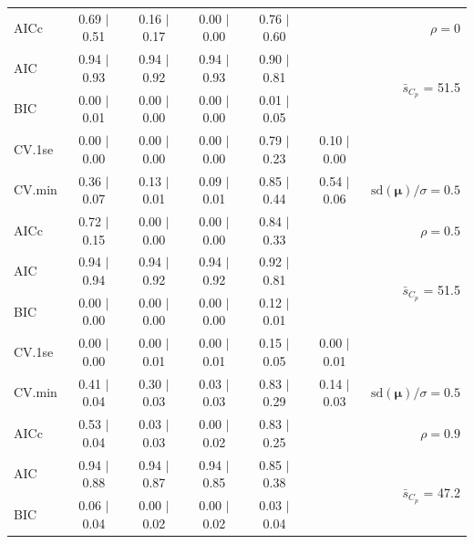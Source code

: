 \documentclass[12pt]{article}
\newcommand{\mr}[1]{\mathrm{#1}}
\newcommand{\bm}[1]{\mathbf{#1}}
\begin{document}
\begin{table}[p]
\begin{center}
\begin{tabular}{l*{5}{c}|r}
AICc & 0.69 $\mid$ 0.51 & 0.16 $\mid$ 0.17 & 0.00 $\mid$ 0.00 & 0.76 $\mid$ 0.60 & & $\rho=0$ \\
AIC & 0.94 $\mid$ 0.93 & 0.94 $\mid$ 0.92 & 0.94 $\mid$ 0.93 & 0.90 $\mid$ 0.81 & & \multirow{2}{*}{$\bar{s}_{C_p}$ = 51.5} \\
BIC & 0.00 $\mid$ 0.01 & 0.00 $\mid$ 0.00 & 0.00 $\mid$ 0.00 & 0.01 $\mid$ 0.05 & & \\
 \hline 
CV.1se & 0.00 $\mid$ 0.00 & 0.00 $\mid$ 0.00 & 0.00 $\mid$ 0.00 & 0.79 $\mid$ 0.23 & 0.10 $\mid$ 0.00 &\\
CV.min & 0.36 $\mid$ 0.07 & 0.13 $\mid$ 0.01 & 0.09 $\mid$ 0.01 & 0.85 $\mid$ 0.44 & 0.54 $\mid$ 0.06 &  $\mr{sd}(\bm{\mu})/\sigma=0.5$ \\
AICc & 0.72 $\mid$ 0.15 & 0.00 $\mid$ 0.00 & 0.00 $\mid$ 0.00 & 0.84 $\mid$ 0.33 & & $\rho=0.5$ \\
AIC & 0.94 $\mid$ 0.94 & 0.94 $\mid$ 0.92 & 0.94 $\mid$ 0.92 & 0.92 $\mid$ 0.81 & & \multirow{2}{*}{$\bar{s}_{C_p}$ = 51.5} \\
BIC & 0.00 $\mid$ 0.00 & 0.00 $\mid$ 0.00 & 0.00 $\mid$ 0.00 & 0.12 $\mid$ 0.01 & & \\
 \hline 
CV.1se & 0.00 $\mid$ 0.00 & 0.00 $\mid$ 0.01 & 0.00 $\mid$ 0.01 & 0.15 $\mid$ 0.05 & 0.00 $\mid$ 0.01 &\\
CV.min & 0.41 $\mid$ 0.04 & 0.30 $\mid$ 0.03 & 0.03 $\mid$ 0.03 & 0.83 $\mid$ 0.29 & 0.14 $\mid$ 0.03 &  $\mr{sd}(\bm{\mu})/\sigma=0.5$ \\
AICc & 0.53 $\mid$ 0.04 & 0.03 $\mid$ 0.03 & 0.00 $\mid$ 0.02 & 0.83 $\mid$ 0.25 & & $\rho=0.9$ \\
AIC & 0.94 $\mid$ 0.88 & 0.94 $\mid$ 0.87 & 0.94 $\mid$ 0.85 & 0.85 $\mid$ 0.38 & & \multirow{2}{*}{$\bar{s}_{C_p}$ = 47.2} \\
BIC & 0.06 $\mid$ 0.04 & 0.00 $\mid$ 0.02 & 0.00 $\mid$ 0.02 & 0.03 $\mid$ 0.04 & & \\
 \hline 
 \end{tabular}
\end{center}
\vspace{-1cm}
\end{table}
\end{document}
